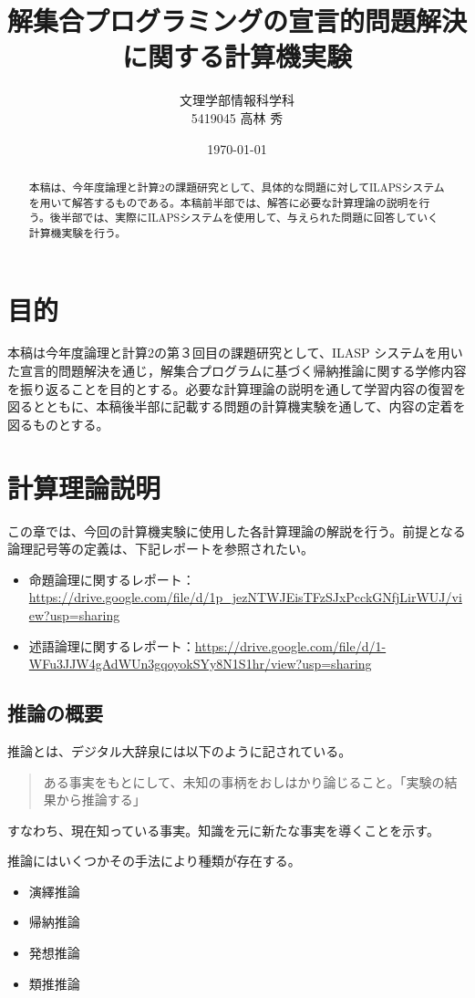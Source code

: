 \documentclass[dvipdfmx]{jsarticle}
\title{解集合プログラミングの宣言的問題解決に関する計算機実験}
\author{文理学部情報科学科\\5419045 高林 秀}
\date{\today}
\begin{document}
\maketitle

\begin{abstract}
本稿は、今年度論理と計算2の課題研究として、具体的な問題に対してILAPSシステムを用いて解答するものである。本稿前半部では、解答に必要な計算理論の説明を行う。後半部では、実際にILAPSシステムを使用して、与えられた問題に回答していく計算機実験を行う。
\end{abstract}

\tableofcontents

\section{目的}
本稿は今年度論理と計算2の第３回目の課題研究として、ILASP システムを用いた宣言的問題解決を通じ，解集合プログラムに基づく帰納推論に関する学修内容を振り返ることを目的とする。必要な計算理論の説明を通して学習内容の復習を図るとともに、本稿後半部に記載する問題の計算機実験を通して、内容の定着を図るものとする。\par

\section{計算理論説明}
この章では、今回の計算機実験に使用した各計算理論の解説を行う。前提となる論理記号等の定義は、下記レポートを参照されたい。
\begin{itemize}
  \item 命題論理に関するレポート：\url{https://drive.google.com/file/d/1p_jezNTWJEisTFzSJxPcckGNfjLirWUJ/view?usp=sharing}
  \item 述語論理に関するレポート：\url{https://drive.google.com/file/d/1-WFu3JJW4gAdWUn3gqoyokSYy8N1S1hr/view?usp=sharing}
\end{itemize}
\subsection{推論の概要}
推論とは、デジタル大辞泉には以下のように記されている。
\begin{quote}
  ある事実をもとにして、未知の事柄をおしはかり論じること。「実験の結果から推論する」\par
\end{quote}
すなわち、現在知っている事実。知識を元に新たな事実を導くことを示す。\par
推論にはいくつかその手法により種類が存在する。
\begin{itemize}
  \item 演繹推論
  \item 帰納推論
  \item 発想推論
  \item 類推推論
\end{itemize}
\end{document}
